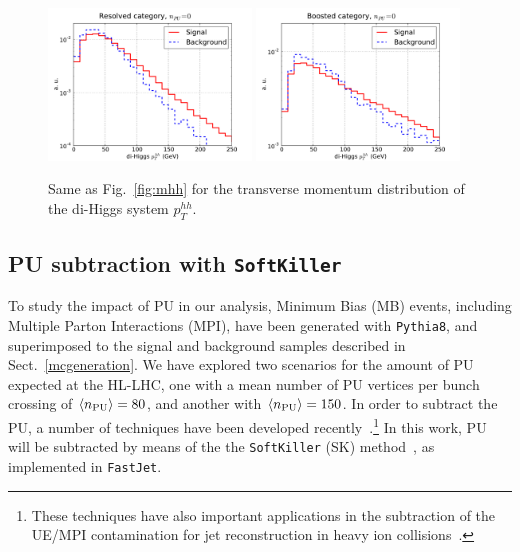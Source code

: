\begin{figure}[t]
\begin{center}
  \includegraphics[width=0.48\textwidth]{plots/pt_HH_C2_res_noPU.pdf}
  \includegraphics[width=0.48\textwidth]{plots/pt_HH_C2_bst_noPU.pdf}
  \caption{\small Same as Fig.~\ref{fig:mhh} for the transverse momentum
    distribution of the di-Higgs system $p_T^{hh}$.
}
\label{fig:pthh}
\end{center}
\end{figure}


\subsection{PU subtraction with {\tt SoftKiller}}
\label{sec:pileup}

To study the impact of PU in our analysis,
Minimum Bias (MB) events,
including Multiple Parton Interactions (MPI), have been generated
with {\tt Pythia8}, and
superimposed to the signal
and background samples described in Sect.~\ref{mcgeneration}.
%
We have explored two scenarios for the amount of PU expected
at the HL-LHC, one with a mean number of
PU vertices per bunch crossing of $\left\langle n_{\rm PU}\right\rangle=80$, and another
with $\left\langle n_{\rm PU}\right\rangle=150$.
%
In order to subtract the PU, a number of techniques
have been developed
recently~\cite{Cacciari:2009dp,TheATLAScollaboration:2013pia,Butterworth:2008iy,Cacciari:2007fd,Krohn:2009th,Krohn:2013lba,Ellis:2009me,Bertolini:2014bba,Cacciari:2014gra,Cacciari:2014jta,Berta:2014eza,Larkoski:2014wba}.\footnote{
These techniques have also important applications in the subtraction
of the UE/MPI contamination for jet reconstruction
in heavy ion collisions~\cite{Cacciari:2010te}.
}
%
In this work, PU  will be subtracted by means
of the the {\tt SoftKiller} (SK)
method~\cite{Cacciari:2014gra}, as implemented in {\tt FastJet}.
%

